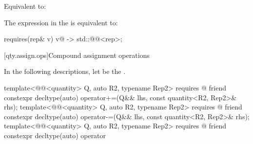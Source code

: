\begin{itemdescr}
\pnum
\effects
Equivalent to:

\pnum
\remarks
The expression in the  is equivalent to:
\begin{codeblock}
requires(rep& v) {
  { v@\atsign@ } -> std::@@<rep>;
}
\end{codeblock}
\end{itemdescr}

[qty.assign.ops]{Compound assignment operations}

\pnum
In the following descriptions,
let  be the .

\begin{itemdecl}
template<@@<quantity> Q, auto R2, typename Rep2>
  requires @\seebelownc@
friend constexpr decltype(auto) operator+=(Q&& lhs, const quantity<R2, Rep2>& rhs);
template<@@<quantity> Q, auto R2, typename Rep2>
  requires @\seebelownc@
friend constexpr decltype(auto) operator-=(Q&& lhs, const quantity<R2, Rep2>& rhs);
template<@@<quantity> Q, auto R2, typename Rep2>
  requires @\seebelownc@
friend constexpr decltype(auto) operator%
\end{itemdecl}

